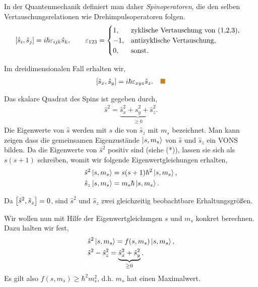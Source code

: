 In der Quantenmechanik definiert man daher \emph{Spinoperatoren}, die den
selben Vertauschungsrelationen wie Drehimpulsoperatoren folgen.
\begin{align*}
&\left[\hat{s}_i,\hat{s}_j\right] = i\hbar\varepsilon_{ijk} \hat{s}_k,\qquad
\varepsilon_{123} =
\begin{cases}
1, & \text{zyklische Vertauschung von (1,2,3)},\\
-1, & \text{antizyklische Vertauschung},\\
0, & \text{sonst}.
\end{cases}
\end{align*}
\begin{bspn} Im dreidimensionalen Fall erhalten wir,
\begin{align*}
\nrm{\hat{s}_x,\hat{s}_y} = i\hbar \ep_{xyz}\hat{s}_z.\bsphere
\end{align*}
\end{bspn}
Das skalare Quadrat des Spins ist gegeben durch,
\begin{align*}
\hat{s}^2 = \underbrace{\hat{s}_x^2 + \hat{s}_y^2 + \hat{s}_z^2}_{\ge 0}.\tag{*}
\end{align*}
Die Eigenwerte von $\hat{s}$ werden mit $s$ die von $\hat{s}_z$ mit
$m_s$ bezeichnet. Man kann zeigen dass die gemeinsamen Eigenzustände
$\left|s,m_s\right\rangle$ von $\hat{s}$ und $\hat{s}_z$ ein VONS bilden. Da die Eigenwerte
von $\hat{s}^2$ positiv sind (siehe (*)), lassen sie sich als $s(s+1)$
schreiben, womit wir folgende Eigenwertgleichungen erhalten,
\begin{align*}
&\hat{s}^2\left|s,m_s\right\rangle = s(s+1)\hbar^2\left|s,m_s\right\rangle,\\
&\hat{s}_z\left|s,m_s\right\rangle = m_s\hbar\left|s,m_s\right\rangle.
\end{align*}
\begin{bemn}
Da $\left[\hat{s}^2,\hat{s}_z\right]=0$, sind $\hat{s}^2$ und $\hat{s}_z$ zwei
gleichzeitig beobachtbare Erhaltungsgrößen.\maphere
\end{bemn}
Wir wollen nun mit Hilfe der Eigenwertgleichungen $s$ und $m_s$ konkret
berechnen. Dazu halten wir fest,
\begin{align*}
&\hat{s}^2\left|s,m_s\right\rangle = f(s,m_s)\left|s,m_s\right\rangle,\\
&\hat{s}^2-\hat{s}_z^2 = \underbrace{\hat{s}_x^2 + \hat{s}_y^2}_{\ge 0}.
\end{align*}
Es gilt also $f(s,m_s)\ge \hbar^2 m_s^2$, d.h. $m_s$ hat einen Maximalwert.

